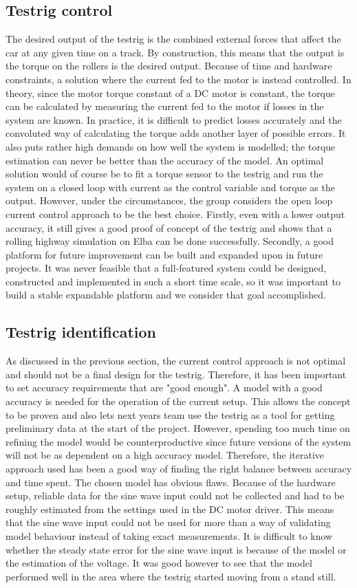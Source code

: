 \subsection{Testrig control}
The desired output of the testrig is the combined external forces that affect
the car at any given time on a track. By construction, this means that the
output is the torque on the rollers is the desired output. Because of time
and hardware constraints, a solution where the current fed to the motor is
instead controlled. In theory, since the motor torque constant of a DC motor is
constant, the torque can be calculated by measuring the current fed to the
motor if losses in the system are known. In practice, it is difficult to
predict losses accurately and the convoluted way of calculating the torque adds
another layer of possible errors. It also puts rather high demands on how well
the system is modelled; the torque estimation can never be better than the
accuracy of the model. An optimal solution would of course be to fit a torque
sensor to the testrig and run the system on a closed loop with current as the
control variable and torque as the output. However, under the
circumstances, the group considers the open loop current control approach to be
the best choice. Firstly, even with a lower output accuracy, it still gives a
good proof of concept of the testrig and shows that a rolling highway simulation
on Elba can be done successfully. Secondly, a good platform for future
improvement can be built and expanded upon in future projects. It was never
feasible that a full-featured system could be designed, constructed and
implemented in such a short time scale, so it was important to build a stable
expandable platform and we consider that goal accomplished.

\subsection{Testrig identification}
As discussed in the previous section, the current control approach is not
optimal and should not be a final design for the testrig. Therefore, it has been
important to set accuracy requirements that are "good enough". A model with a
good accuracy is needed for the operation of the current setup. This allows the
concept to be proven and also lets next years team use the testrig as a tool for
getting preliminary data at the start of the project. However, spending too much
time on refining the model would be counterproductive since future versions of
the system will not be as dependent on a high accuracy model. Therefore, the
iterative approach used has been a good way of finding the right balance between
accuracy and time spent. The chosen model has obvious flaws.  Because of the
hardware setup, reliable data for the sine wave input could not be collected and
had to be roughly estimated from the settings used in the DC motor driver. This
means that the sine wave input could not be used for more than a way of
validating model behaviour instead of taking exact measurements.  It is
difficult to know whether the steady state error for the sine wave input is
because of the model or the estimation of the voltage.  It was good however to
see that the model performed well in the area where the testrig started moving
from a stand still. 

